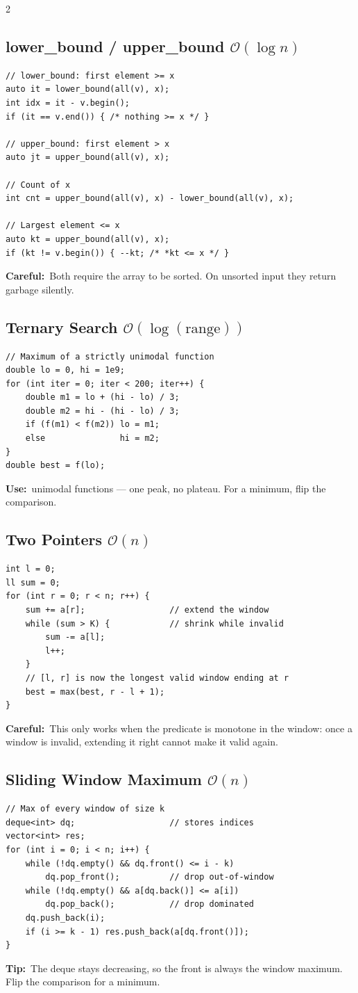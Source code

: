 \documentclass[10pt]{article}
\newcommand{\sub}[2]{\subsection[#1]{#1\hspace{0.6em}%
  \textnormal{\color{accent2}\small$\mathcal{O}(#2)$}}}
\newcommand{\uses}[1]{{\color{accent2}\footnotesize\textbf{Use:}}~{\footnotesize #1}\par}
\newcommand{\tip}[1]{{\color{tipc}\footnotesize\textbf{Tip:}}~{\footnotesize #1}\par}
\newcommand{\warn}[1]{{\color{warnc}\footnotesize\textbf{Careful:}}~{\footnotesize #1}\par}
\begin{document}
\begin{multicols}{2}
\sub{lower\_bound / upper\_bound}{\log n}
\begin{lstlisting}
// lower_bound: first element >= x
auto it = lower_bound(all(v), x);
int idx = it - v.begin();
if (it == v.end()) { /* nothing >= x */ }

// upper_bound: first element > x
auto jt = upper_bound(all(v), x);

// Count of x
int cnt = upper_bound(all(v), x) - lower_bound(all(v), x);

// Largest element <= x
auto kt = upper_bound(all(v), x);
if (kt != v.begin()) { --kt; /* *kt <= x */ }
\end{lstlisting}
\warn{Both require the array to be sorted. On unsorted input they return
garbage silently.}

\sub{Ternary Search}{\log(\text{range})}
\begin{lstlisting}
// Maximum of a strictly unimodal function
double lo = 0, hi = 1e9;
for (int iter = 0; iter < 200; iter++) {
    double m1 = lo + (hi - lo) / 3;
    double m2 = hi - (hi - lo) / 3;
    if (f(m1) < f(m2)) lo = m1;
    else               hi = m2;
}
double best = f(lo);
\end{lstlisting}
\uses{unimodal functions --- one peak, no plateau. For a minimum, flip
the comparison.}

\sub{Two Pointers}{n}
\begin{lstlisting}
int l = 0;
ll sum = 0;
for (int r = 0; r < n; r++) {
    sum += a[r];                 // extend the window
    while (sum > K) {            // shrink while invalid
        sum -= a[l];
        l++;
    }
    // [l, r] is now the longest valid window ending at r
    best = max(best, r - l + 1);
}
\end{lstlisting}
\warn{This only works when the predicate is monotone in the window: once
a window is invalid, extending it right cannot make it valid again.}

\sub{Sliding Window Maximum}{n}
\begin{lstlisting}
// Max of every window of size k
deque<int> dq;                   // stores indices
vector<int> res;
for (int i = 0; i < n; i++) {
    while (!dq.empty() && dq.front() <= i - k)
        dq.pop_front();          // drop out-of-window
    while (!dq.empty() && a[dq.back()] <= a[i])
        dq.pop_back();           // drop dominated
    dq.push_back(i);
    if (i >= k - 1) res.push_back(a[dq.front()]);
}
\end{lstlisting}
\tip{The deque stays decreasing, so the front is always the window
maximum. Flip the comparison for a minimum.}


\end{multicols}
\end{document}
